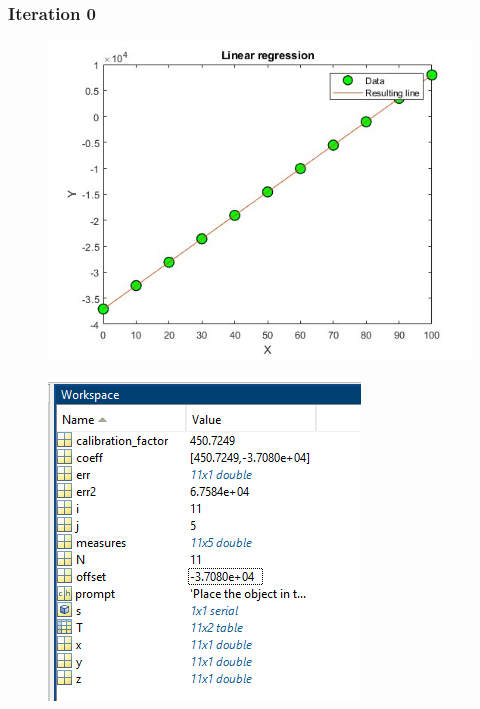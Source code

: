 \subsubsection{Iteration 0}

\begin{figure}[ht]
\centering
\begin{minipage}{.6\textwidth} %
  \centering
  \includegraphics[width=.9\linewidth]{medias/test/calibration/figure_0.jpg}
  \label{fig:test1}
\end{minipage}%
\begin{minipage}{.4\textwidth} %
  \centering
  \includegraphics[width=.9\linewidth]{medias/test/calibration/workspace_0.png}
  \label{fig:test2}
\end{minipage}
\end{figure}


